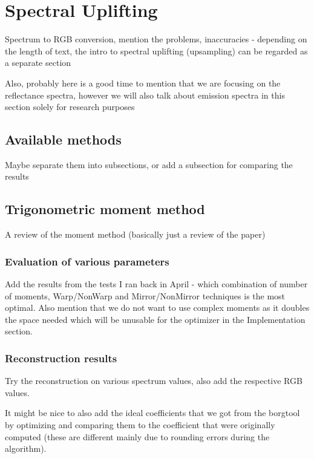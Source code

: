 \chapter{Spectral Uplifting}

Spectrum to RGB conversion, mention the problems, inaccuracies - depending on the length of text, the intro to spectral uplifting (upsampling) can be regarded as a separate section

Also, probably here is a good time to mention that we are focusing on the reflectance spectra, however we will also talk about emission spectra in this section solely for research purposes

\section{Available methods}

Maybe separate them into subsections, or add a subsection for comparing the results

\section{Trigonometric moment method}

A review of the moment method (basically just a review of the paper)

\subsection{Evaluation of various parameters}

Add the results from the tests I ran back in April - which combination of number of moments, Warp/NonWarp and Mirror/NonMirror techniques is the most optimal. Also mention that we do not want to use complex moments as it doubles the space needed which will be unusable for the optimizer in the Implementation section. 

\subsection{Reconstruction results}
Try the reconstruction on various spectrum values, also add the respective RGB values.

It might be nice to also add the ideal coefficients that we got from the borgtool by optimizing and comparing them to the coefficient that were originally computed (these are different mainly due to rounding errors during the algorithm). 